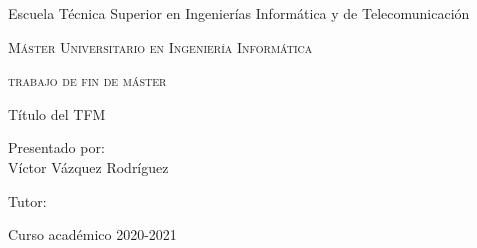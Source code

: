 \begin{titlepage}
    \AddToShipoutPicture*{\BackgroundPic}

    \begin{addmargin}[2.575cm]{0cm}
        \begin{flushleft}
            \Large
            \hfill\vfil

            \large{\textsf{Escuela Técnica Superior en Ingenierías Informática y de Telecomunicación}}
            \vfill

            {\large\textsc{Máster Universitario en Ingeniería Informática}} \vfill


            {\large\textsc{trabajo de fin de máster}}

            \begingroup
            \Huge{Título del TFM}
            \endgroup

            \vfill\vfill\vfill\vfill

            \textsf{\normalsize{Presentado por:}}\\
            {\normalsize\textrm{Víctor Vázquez Rodríguez}}
            \bigskip

            \textsf{\normalsize{Tutor:}}\\
            {\normalsize{}}

            \bigskip
            \textsf{\normalsize{Curso académico 2020-2021}}
        \end{flushleft}
    \end{addmargin}
\end{titlepage}
\cleardoublepage